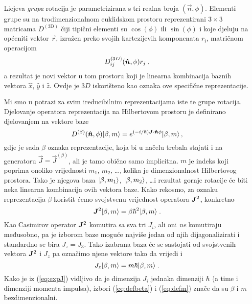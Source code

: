 Liejeva \emph{grupa} rotacija je parametrizirana s tri realna broja $(\vec{n}, \phi)$.
Elementi grupe su na trodimenzionalnom euklidskom prostoru reprezentirani $3\times 3$
matricama $D^{(\mathrm{3D})}$
čiji tipični elementi su $\cos(\phi)$ ili $\sin(\phi)$ i koje djeluju
na općeniti vektor $\vec{r}$, izražen preko svojih kartezijevih komponenata $r_i$,
matričnom operacijom
\begin{displaymath}
   D^{(3D)}_{ij}(\unitn, \phi) r_j  \;,
\end{displaymath}
a rezultat je novi vektor u tom prostoru koji je linearna kombinacija
baznih vektora $\hat{x}$, $\hat{y}$ i $\hat{z}$.
Ovdje je $3D$ iskorišteno kao oznaka ove specifične reprezentacije.

Mi smo u potrazi za svim ireducibilnim reprezentacijama iste te grupe rotacija.
Djelovanje operatora reprezentacija na Hilbertovom prostoru je definirano
djelovanjem na vektore baze
\begin{equation}
   D^{(\beta)}(\unitn,\phi) \ket{\beta, m} =
 e^{(-i/\hbar)\vec{J}\cdot\unitn\phi}\ket{\beta, m} \,,
 \label{eq:Drot}
\end{equation}
gdje je sada $\beta$ oznaka reprezentacije, koja bi u načelu trebala
stajati i na generatoru $\vec{J} = \vec{J}^{(\beta)}$, ali je tamo obično samo implicitna.
$ m $ je indeks koji poprima onoliko vrijednosti $m_1$, $m_2$, \ldots, kolika je dimenzionalnost
Hilbertovog prostora. Tako je njegova baza
$| \beta, m_1 \rangle$, $| \beta, m_2 \rangle$, \ldots i rezultat gornje rotacije će
biti neka linearna kombinacija ovih vektora baze. Kako rekosmo, za oznaku 
reprezentacija $\beta$ koristit ćemo svojstvenu vrijednost operatora $\jsq$,
konkretno
\begin{equation}
  \jsq \ket{\beta, m} = \beta \hbar^2 \ket{\beta, m} \;.
  \label{eq:defbeta}
\end{equation}
Kao Casimirov operator $\jsq$ komutira sa sva tri $J_i$, ali oni \emph{ne}
komutiraju međusobno, pa je izborom baze moguće najviše jedan od njih
dijagonalizirati i standardno se bira $J_{z} = J_{3}$. Tako izabrana baza
će se sastojati od svojstvenih vektora $\jsq$ i $J_z$ pa označimo 
njene vektore tako da vrijedi i
\begin{equation}
  J_z | \beta, m \rangle = m \hbar | \beta, m \rangle \;.
  \label{eq:defm}
\end{equation}
Kako je iz (\ref{eq:expJ}) vidljivo da je dimenzija $J_i$ jednaka
dimenziji $\hbar$ (a time i dimenziji momenta impulsa), izbori
(\ref{eq:defbeta})  i (\ref{eq:defm}) znače da su $\beta$ i $m$
bezdimenzionalni. 

